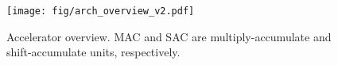 \begin{figure}[t] 
    \centering 
    \texttt{[image: fig/arch\_overview\_v2.pdf]}  
    \caption{Accelerator overview. MAC and SAC are multiply-accumulate and shift-accumulate units, respectively.}
    \label{fig:arch_overview}
\end{figure}